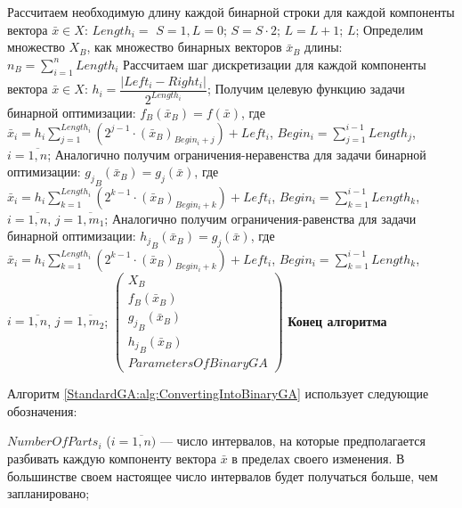 \begin{algorithm}
\begin{algorithmic}
\State Рассчитаем необходимую длину каждой бинарной строки для каждой компоненты вектора $ \bar{x}\in X $:
\State $ Length_i= $
\BeginBlock
\State $ S=1, L=0 $;
\State $ S=S\cdot 2 $;
\State $ L=L+1 $;
\EndWhile
\State \Return $ L $;
\EndBlock
\State Определим множество $ X_B $, как множество бинарных векторов $ \bar{x}_B $ длины:  
\State $ n_B=\sum_{i=1}^{n} Length_i$
\State Рассчитаем шаг дискретизации для каждой компоненты вектора  $ \bar{x} \in X $:  
\State $ h_i=\dfrac{\left| Left_i-Right_i\right| }{2^{Length_i}} $;
\State Получим целевую функцию задачи бинарной оптимизации:
\State $ f_B\left( \bar{x}_B\right)=f\left( \bar{x}\right) $, где
\State $ \bar{x}_i=h_i \sum_{j=1}^{Length_i} \left( 2^{j-1}\cdot {\left( \bar{x}_B\right) }_{Begin_i+j} \right)+Left_i $,
\State $ Begin_i =\sum_{j=1}^{i-1}Length_j $, $ i=\overline{1,n} $;
\State Аналогично получим ограничения-неравенства для задачи бинарной оптимизации:
\State $ {g_j}_B\left( \bar{x}_B\right)=g_j\left( \bar{x}\right) $, где
\State $ \bar{x}_i=h_i \sum_{k=1}^{Length_i} \left( 2^{k-1}\cdot {\left( \bar{x}_B\right) }_{Begin_i+k} \right)+Left_i $,
\State $ Begin_i =\sum_{k=1}^{i-1}Length_k $, $ i=\overline{1,n} $, $ j=\overline{1,m_1} $;
\State Аналогично получим ограничения-равенства для задачи бинарной оптимизации:
\State $ {h_j}_B\left( \bar{x}_B\right)=g_j\left( \bar{x}\right) $, где
\State $ \bar{x}_i=h_i \sum_{k=1}^{Length_i} \left( 2^{k-1}\cdot {\left( \bar{x}_B\right) }_{Begin_i+k} \right)+Left_i $,
\State $ Begin_i =\sum_{k=1}^{i-1}Length_k $, $ i=\overline{1,n} $, $ j=\overline{1,m_2} $;
\State \Return $ \left( 
\begin{array}{c}
X_B\\f_B\left( \bar{x}_B\right)\\{g_j}_B\left( \bar{x}_B\right)\\{h_j}_B\left( \bar{x}_B\right)\\ParametersOfBinaryGA
\end{array}
\right)  $
\State \textbf{Конец алгоритма}
\end{algorithmic}
\end{algorithm}

Алгоритм \ref{StandardGA:alg:ConvertingIntoBinaryGA} использует следующие обозначения:

$NumberOfParts_i  $ ($ i=\overline{1,n}) $ --- число интервалов, на которые предполагается разбивать каждую компоненту вектора $ \bar{x}$ в пределах своего изменения. В большинстве своем настоящее число интервалов будет получаться больше, чем запланировано;

